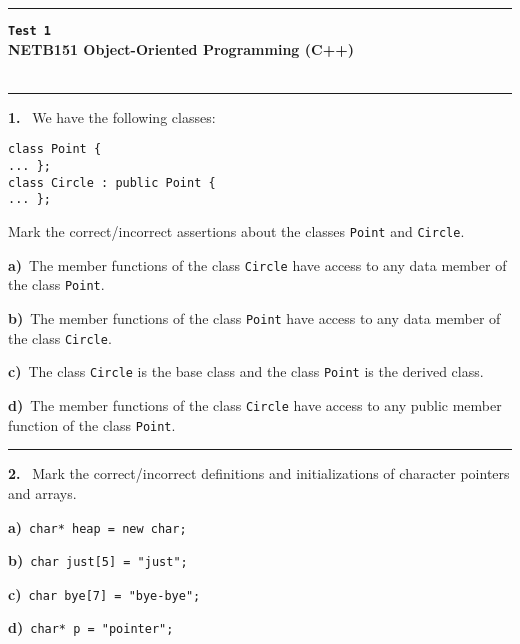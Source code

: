 \newpage\thispagestyle{empty}\par 
\hrule 
\begin{center}
{\bf\large {}}\hfill {\bf\large\verb|Test 1|}
 \hfill{\bf\large {}}\\ 
{\bf\large NETB151 Object-Oriented Programming (C++)}\\[4pt]
{\bf \large {}}\\ 
\end{center}\par
 \vspace{-4mm}
\begin{multicols}{2}
\par\smallskip\hrule\par\medskip

{\bf 1. }\ We have the following classes:
 \vspace{-3mm}\begin{verbatim}
class Point {
... };
class Circle : public Point {
... };
 \end{verbatim}\vspace{-6mm}
Mark the correct/incorrect assertions about the classes
\verb|Point| and \verb|Circle|.

{\bf a)}\ The member functions of the class \verb|Circle| have access to any data member of the class \verb|Point|.

{\bf b)}\ The member functions of the class \verb|Point| have access to any data member of the class \verb|Circle|.

{\bf c)}\ The class \verb|Circle| is the base class and the class \verb|Point| is the derived class.

{\bf d)}\ The member functions of the class \verb|Circle| have access to any public member function of the class \verb|Point|.

\par\smallskip\hrule\par\medskip

{\bf 2. }\ Mark the correct/incorrect definitions and initializations 
of character pointers and arrays.

{\bf a)}\ \verb|char* heap = new char;|

{\bf b)}\ \verb|char just[5] = "just";|

{\bf c)}\ \verb|char bye[7] = "bye-bye";|

{\bf d)}\ \verb|char* p = "pointer";|


\end{multicols}
